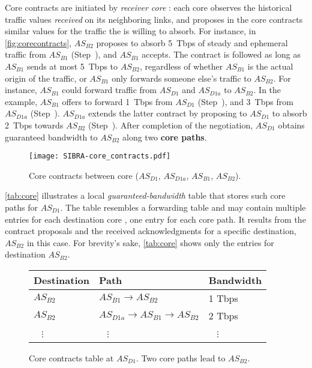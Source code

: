 Core contracts are initiated by \textit{receiver core \ADs}: each core \AD
observes the historical traffic values \textit{received} on its neighboring
links, and proposes in the core contracts similar values for the traffic the
\AD is willing to absorb. For instance, in \autoref{fig:corecontracts},
$AS_{B2}$ proposes to absorb 5~Tbps of steady and ephemeral traffic from
$AS_{B1}$ (Step~), and $AS_{B1}$ accepts. The contract is followed as long as $AS_{B1}$
sends at most 5~Tbps to $AS_{B2}$, regardless of whether $AS_{B1}$ is the
actual origin of the traffic, or $AS_{B1}$ only forwards someone else's traffic
to $AS_{B2}$. For instance, $AS_{B1}$ could forward traffic from $AS_{D1}$ and
$AS_{D1a}$ to $AS_{B2}$. In the example, $AS_{B1}$ offers to forward 1~Tbps
from $AS_{D1}$ (Step~), and 3~Tbps from $AS_{D1a}$
(Step~). $AS_{D1a}$ extends the latter contract by proposing to
$AS_{D1}$ to absorb 2~Tbps towards $AS_{B2}$ (Step~). After
completion of the negotiation, $AS_{D1}$ obtains guaranteed bandwidth to
$AS_{B2}$ along two \textbf{core paths}.


\label{sec:contracts}
\begin{figure}[t]
  \begin{center}
    \texttt{[image: SIBRA-core\_contracts.pdf]}
  \end{center}
  \caption{Core contracts between core \ADs ($AS_{D1}$, $AS_{D1a}$, $AS_{B1}$,
    $AS_{B2}$).}
  \vspace{-3mm}
  \label{fig:corecontracts}
\end{figure}

\autoref{tab:core} illustrates a local \emph{guaranteed-bandwidth} table that
stores such core paths for $AS_{D1}$. The table resembles a forwarding table
and may contain multiple entries for each destination core \AD, one entry for
each core path. It results from the contract proposals and the received
acknowledgments for a specific destination, $AS_{B2}$ in this case. For
brevity's sake, \autoref{tab:core} shows only the entries for destination
$AS_{B2}$.

\begin{figure}[tp]
\small
\renewcommand{\arraystretch}{1.0}
\centering
 \begin{tabular}{lll}
 \hline
 Destination & \centering Path & Bandwidth \\ [0.5ex]
 \hline\hline
 $AS_{B2}$& $AS_{B1} \rightarrow AS_{B2}$ & 1 Tbps\\
 $AS_{B2}$& $AS_{D1a} \rightarrow AS_{B1}\rightarrow AS_{B2}$ & 2 Tbps \\ [-1ex]
 ~ $\vdots$ & ~ $\vdots$ & ~ $\vdots$ \\
 \hline
 \end{tabular}
\caption{Core contracts table at $AS_{D1}$. Two core paths lead to $AS_{B2}$.}
\vspace{-5mm}
\label{tab:core}
\end{figure}

